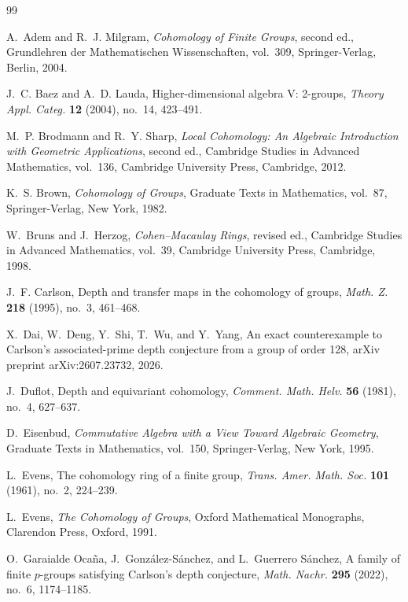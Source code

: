 \documentclass[11pt]{amsart}
\theoremstyle{definition}
\theoremstyle{remark}
\begin{document}
\begin{thebibliography}{99}

A.~Adem and R.~J. Milgram,
\emph{Cohomology of Finite Groups}, second ed.,
Grundlehren der Mathematischen Wissenschaften, vol.~309,
Springer-Verlag, Berlin, 2004.

J.~C. Baez and A.~D. Lauda,
Higher-dimensional algebra V: 2-groups,
\emph{Theory Appl. Categ.} \textbf{12} (2004), no.~14, 423--491.

M.~P. Brodmann and R.~Y. Sharp,
\emph{Local Cohomology: An Algebraic Introduction with Geometric Applications}, second ed.,
Cambridge Studies in Advanced Mathematics, vol.~136,
Cambridge University Press, Cambridge, 2012.

K.~S. Brown,
\emph{Cohomology of Groups},
Graduate Texts in Mathematics, vol.~87,
Springer-Verlag, New York, 1982.

W.~Bruns and J.~Herzog,
\emph{Cohen--Macaulay Rings}, revised ed.,
Cambridge Studies in Advanced Mathematics, vol.~39,
Cambridge University Press, Cambridge, 1998.

J.~F. Carlson,
Depth and transfer maps in the cohomology of groups,
\emph{Math. Z.} \textbf{218} (1995), no.~3, 461--468.


X.~Dai, W.~Deng, Y.~Shi, T.~Wu, and Y.~Yang,
An exact counterexample to Carlson's associated-prime depth conjecture from a group of order 128,
arXiv preprint arXiv:2607.23732, 2026.

J.~Duflot,
Depth and equivariant cohomology,
\emph{Comment. Math. Helv.} \textbf{56} (1981), no.~4, 627--637.

D.~Eisenbud,
\emph{Commutative Algebra with a View Toward Algebraic Geometry},
Graduate Texts in Mathematics, vol.~150,
Springer-Verlag, New York, 1995.

L.~Evens,
The cohomology ring of a finite group,
\emph{Trans. Amer. Math. Soc.} \textbf{101} (1961), no.~2, 224--239.

L.~Evens,
\emph{The Cohomology of Groups},
Oxford Mathematical Monographs,
Clarendon Press, Oxford, 1991.

O.~Garaialde Oca\~na, J.~Gonz\'alez-S\'anchez, and L.~Guerrero S\'anchez,
A family of finite \(p\)-groups satisfying Carlson's depth conjecture,
\emph{Math. Nachr.} \textbf{295} (2022), no.~6, 1174--1185.


\end{thebibliography}
\end{document}
